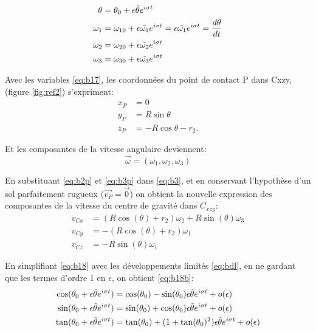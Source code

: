 \begin{align}
 \theta&=\theta_0 + \epsilon \Tilde{\theta} e^{i \sigma t} \nonumber\\
 \omega_1&= \omega_{10} + \epsilon \Tilde{\omega_1} e^{i \sigma t} = \epsilon \Tilde{\omega_1} e^{i \sigma t} = \frac{d\theta }{dt} \nonumber\\
 \omega_2&= \omega_{20} + \epsilon \Tilde{\omega_2} e^{i \sigma t} \nonumber\\
 \omega_3&= \omega_{30} + \epsilon \Tilde{\omega_3} e^{i \sigma t}
  \label{eq:b17}
\end{align}

Avec les variables \ref{eq:b17}, les coordonnées du point de contact P dans C{xzy}, (figure \ref{fig:ref2}) s'expriment:
\begin{align}
    x_P&=0 \nonumber\\
    y_P&=R\sin{\theta} \nonumber\\
    z_P&=-R\cos{\theta}-r_2.
  \label{eq:b2p}
\end{align}

Et les composantes de la vitesse angulaire deviennent:
\begin{equation}
    \vec{\omega}=(\omega_1,\omega_2,\omega_3)
    \label{eq:b3p}
\end{equation}

En substituant \ref{eq:b2p} et \ref{eq:b3p} dans \ref{eq:b3}, et en conservant l'hypothèse d'un sol parfaitement rugueux ($\vec{v_P}=\vec{0}$) on obtient la nouvelle expression des composantes de la vitesse du centre de gravité dans $C_{xzy}$:
\begin{align}
    v_{Cx}&=(R\cos(\theta)+r_2)\omega_2+R \sin(\theta)\omega_3 \nonumber\\
    v_{Cy} &= -(R\cos(\theta)+r_2)\omega_1 \nonumber\\
    v_{Cz} &= -R \sin(\theta)\omega_1
  \label{eq:b18}
\end{align}

En simplifiant \ref{eq:b18} avec les développements limités \ref{eq:bdl}, en ne gardant que les termes d'ordre 1 en $\epsilon$, on obtient \ref{eq:b18b}:
\begin{align}
    \cos(\theta_0 + \epsilon \Tilde{\theta} e^{i \sigma t})&=\cos(\theta_0)- \sin(\theta_0)\epsilon \Tilde{\theta} e^{i \sigma t} + o(\epsilon) \nonumber\\
    \sin(\theta_0 + \epsilon \Tilde{\theta} e^{i \sigma t})&=\sin(\theta_0)+ \cos(\theta_0)\epsilon \Tilde{\theta} e^{i \sigma t} + o(\epsilon)\nonumber\\
    \tan(\theta_0 + \epsilon \Tilde{\theta} e^{i \sigma t})&=\tan(\theta_0)+ (1+\tan(\theta_0)^2)\epsilon \Tilde{\theta} e^{i \sigma t} + o(\epsilon)
\label{eq:bdl}
\end{align}

